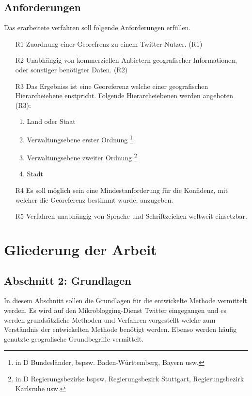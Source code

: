 	\subsection{Anforderungen}\label{sec:Anforderungen}
	Das erarbeitete verfahren soll folgende Anforderungen erfüllen.
		\begin{enumerate}
			\item[R1] Zuordnung einer Georefrenz zu einem Twitter-Nutzer. (R1) 
			\item[R2] Unabhängig von kommerziellen Anbietern geografischer Informationen, oder sonstiger benötigter Daten. (R2)
			\item[R3] Das Ergebniss ist eine Georeferenz welche einer geografischen Hierarcheiebene enstpricht. Folgende Hierarcheiebenen werden angeboten (R3): 
			\begin{enumerate}
			 	\item Land oder Staat
			 	\item Verwaltungsebene erster Ordnung \footnote{in D Bundesländer, bspsw. Baden-Württemberg, Bayern usw. }
			 	\item Verwaltungsebene zweiter Ordnung \footnote{in D Regierungsbezirke bspsw. Regierungsbezirk Stuttgart, Regierungsbezirk Karlsruhe usw.}
			 	\item Stadt
			 \end{enumerate} 
			\item[R4] Es soll möglich sein eine Mindestanforderung für die Konfidenz, mit welcher die Georeferenz bestimmt wurde, anzugeben.  
			\item[R5] Verfahren unabhängig von Sprache und Schriftzeichen weltweit einsetzbar.
		\end{enumerate}
		
	\section{Gliederung der Arbeit}

		\subsection*{Abschnitt 2: Grundlagen}
			In diesem Abschnitt sollen die Grundlagen für die entwickelte Methode vermittelt werden. 
			Es wird auf den Mikroblogging-Dienst Twitter eingegangen und es werden grundsätzliche Methoden und Verfahren vorgestellt welche zum Verständnis der entwickelten Methode benötigt werden. 
			Ebenso werden häufig genutzte geografische Grundbegriffe vermittelt.

